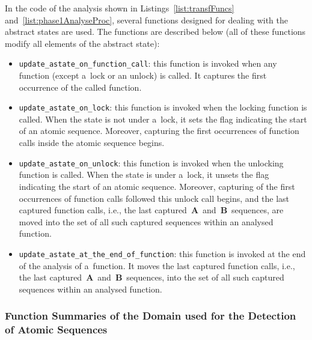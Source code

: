 In the code of the analysis shown in Listings~\ref{list:transfFuncs}
and~\ref{list:phase1AnalyseProc}, several functions designed for dealing
with the abstract states are used. The functions are described below
(all of these functions modify all elements of the abstract state):
\begin{itemize}
    \item
        \texttt{update\_astate\_on\_function\_call}: this function is
        invoked when any function (except a~lock or an unlock) is called.
        It captures the first occurrence of the called function.

    \item
        \texttt{update\_astate\_on\_lock}: this function is invoked when
        the locking function is called. When the state is not under a~lock,
        it sets the flag indicating the start of an atomic sequence. Moreover,
        capturing the first occurrences of function calls inside the atomic
        sequence begins.

    \item
        \texttt{update\_astate\_on\_unlock}: this function is invoked when
        the unlocking function is called. When the state is under a~lock,
        it unsets the flag indicating the start of an atomic sequence.
        Moreover, capturing of the first occurrences of function calls
        followed this unlock call begins, and the last captured function
        calls, i.e., the last captured~\textbf{A}~and~\textbf{B}~sequences,
        are moved into the set of all such captured sequences within an
        analysed function.

    \item
        \texttt{update\_astate\_at\_the\_end\_of\_function}: this function
        is invoked at the end of the analysis of a~function. It moves
        the last captured function calls, i.e., the last
        captured~\textbf{A}~and~\textbf{B}~sequences, into the set
        of all such captured sequences within an analysed function.
\end{itemize}

\subsubsection{%
    Function Summaries of the Domain used for the Detection of Atomic
    Sequences
}

